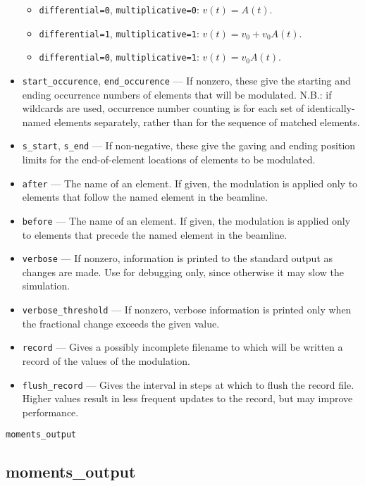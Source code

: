 \documentclass[11pt]{article}
\begin{document}
\begin{itemize}
\begin{itemize}
    \item \verb|differential=0|, \verb|multiplicative=0|: $v(t) = A(t)$.  
    \item \verb|differential=1|, \verb|multiplicative=1|: $v(t) = v_0 + v_0 A(t)$.  
    \item \verb|differential=0|, \verb|multiplicative=1|: $v(t) = v_0 A(t)$.  
  \end{itemize}
\item \verb|start_occurence|, \verb|end_occurence| --- If nonzero, these give the starting and
 ending occurrence numbers of elements that will be modulated. N.B.: if wildcards are used, occurrence
 number counting is for each set of identically-named elements separately, rather than for the sequence
 of matched elements.
\item \verb|s_start|, \verb|s_end| --- If non-negative, these give the gaving and ending position
 limits for the end-of-element locations of elements to be modulated.
\item \verb|after| --- The name of an element.  If given, the modulation is applied only to elements
 that follow the named element in the beamline.  
\item \verb|before| --- The name of an element.  If given, the modulation is applied only to elements
 that precede the named element in the beamline. 
\item \verb|verbose| --- If nonzero, information is printed to the standard output as changes are
        made.  Use for debugging only, since otherwise it may slow the simulation.
\item \verb|verbose_threshold| --- If nonzero, verbose information is printed only when the fractional change
   exceeds the given value.
\item \verb|record| --- Gives a possibly incomplete filename to which will be written a record of the values of
  the modulation.
\item \verb|flush_record| --- Gives the interval in steps at which to flush the record file. Higher values result
 in less frequent  updates to the record, but may improve performance.
\end{itemize}

\newpage
\begin{center}{\Large\verb|moments_output|}\end{center}
\subsection{moments\_output \label{subsec:momentsoutput}}
\end{document}
